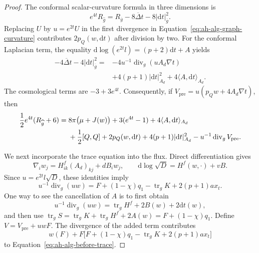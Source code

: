 \begin{proof}
The conformal scalar-curvature formula in three dimensions is
\[
 e^{4t}R_{\widehat g}
   =R_{\overline g}-8\overline\Delta t
                         -8|\mathrm dt|_{\overline g}^2 .
\]
Replacing \(U\) by \(u=e^{2t}U\) in the first divergence in
Equation~\eqref{eq:ah-alg-graph-curvature} contributes
\(2p_Q(w,\mathrm dt)\) after division by two.  For the conformal
Laplacian term, the equality
\(\mathrm d\log(e^{2t}l)=(p+2)\mathrm dt+A\) yields
\begin{align*}
 -4\overline\Delta t-4|\mathrm dt|_{\overline g}^2
   ={}&-4u^{-1}\operatorname{div}_g(uA_d\nabla t)\\
     &+4(p+1)|\mathrm dt|_{A_d}^2
       +4\langle A,\mathrm dt\rangle_{A_d}.
\end{align*}
The cosmological terms are \(-3+3e^{4t}\).  Consequently, if
\(V_{\mathrm{pre}}=u(p_Qw+4A_d\nabla t)\), then
\begin{align}
 \frac12e^{4t}(R_{\widehat g}+6)
 ={}&8\pi\bigl(\mu+J(w)\bigr)+3(e^{4t}-1)
       +4\langle A,\mathrm dt\rangle_{A_d}\notag\\
 &+\frac12[Q,Q]+2p_Q(w,\mathrm dt)
       +4(p+1)|\mathrm dt|_{A_d}^2
       -u^{-1}\operatorname{div}_g V_{\mathrm{pre}}.
 \label{eq:ah-alg-before-trace}
\end{align}

We next incorporate the trace equation into the flux.  Direct
differentiation gives
\begin{equation}
 \nabla_iw_j=H^f_{ik}(A_d)_{kj}+dB_iw_j,\qquad
 \mathrm d\log\sqrt D=H^f(w,\cdot)+vB.
 \label{eq:ah-alg-w-derivatives}
\end{equation}
Since \(u=e^{2t}l\sqrt D\), these identities imply
\begin{equation}
 u^{-1}\operatorname{div}_g(uw)
   =F+(1-\chi)q_1-\operatorname{tr}_gK
                   +2(p+1)a x_t .
 \label{eq:ah-alg-uw-divergence}
\end{equation}
One way to see the cancellation of \(A\) is to first obtain
\[
 u^{-1}\operatorname{div}_g(uw)
   =\operatorname{tr}_g H^f+2B(w)+2\mathrm dt(w),
\]
and then use
\(\operatorname{tr}_gS
 =\operatorname{tr}_gK+\operatorname{tr}_gH^f+2A(w)
 =F+(1-\chi)q_1\).
Define \(V=V_{\mathrm{pre}}+uwF\).  The divergence of the added term contributes
\[
 w(F)+F\bigl[F+(1-\chi)q_1-\operatorname{tr}_gK
                         +2(p+1)a x_t\bigr]
\]
to Equation~\eqref{eq:ah-alg-before-trace}.


\end{proof}
